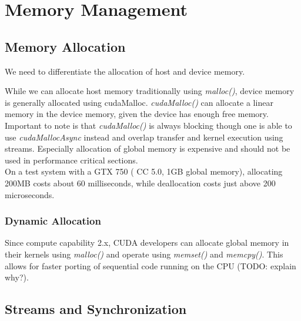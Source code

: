 \section{Memory Management}
\label{sec:management}
\subsection{Memory Allocation}
\label{mem_alloc}
We need to differentiate the allocation of host and device memory.

While we can allocate host memory traditionally using \emph{malloc()}, device memory is generally allocated using cudaMalloc.
\emph{cudaMalloc()} can allocate a linear memory in the device memory, given the device has enough free memory.
Important to note is that \emph{cudaMalloc()} is always blocking though one is able to use \emph{cudaMallocAsync} instead and overlap transfer and kernel execution using streams.
Especially allocation of global memory is expensive and should not be used in performance critical sections.\\
On a test system with a GTX 750 ( CC 5.0, 1GB global memory), allocating 200MB costs about 60 milliseconds, while deallocation costs just above 200 microseconds.
\subsubsection{Dynamic Allocation}
Since compute capability 2.x, CUDA developers can allocate global memory in their kernels using \emph{malloc()} and operate using \emph{memset()} and \emph{memcpy()}.
This allows for faster porting of sequential code running on the CPU (TODO: explain why?).\\
\subsection{Streams and Synchronization}
